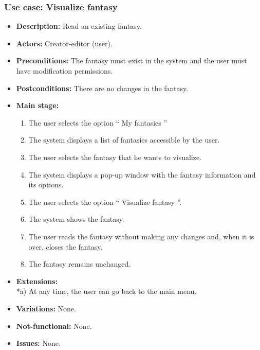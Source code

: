\subsubsection{Use case: Visualize fantasy}
\begin{itemize}
	\item \textbf{Description:} Read an existing fantasy.
	\item \textbf{Actors:} Creator-editor (user).
	\item \textbf{Preconditions:} The fantasy must exist in the system and the user must have modification permissions.
	\item \textbf{Postconditions:} There are no changes in the fantasy.
	\item \textbf{Main stage:}
	\begin{enumerate}
		\item The user selects the option `` My fantasies ''
		\item The system displays a list of fantasies accessible by the user.
		\item The user selects the fantasy that he wants to visualize.
		\item The system displays a pop-up window with the fantasy information and its options.
		\item The user selects the option `` Visualize fantasy ''.
		\item The system shows the fantasy.
		\item The user reads the fantasy without making any changes and, when it is over, closes the fantasy.
		\item The fantasy remains unchanged.
	\end{enumerate}
	\item \textbf{Extensions:} \\ *a) At any time, the user can go back to the main menu.
	\item \textbf{Variations:} None.
	\item \textbf{Not-functional:} None.
	\item \textbf{Issues:} None.
\end{itemize}

